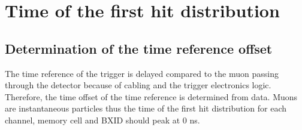 \section{Time of the first hit distribution}
\label{sec:TimeFH}

\subsection{Determination of the time reference offset}

The time reference of the trigger is delayed compared to the muon passing through the detector because of cabling and the trigger electronics logic. Therefore, the time offset of the time reference is determined from data. Muons are instantaneous particles thus the time of the first hit distribution for each channel, memory cell and BXID should peak at 0 ns.

